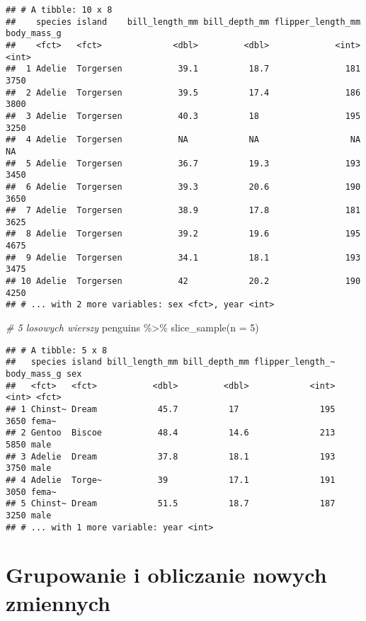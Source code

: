 \documentclass[
]{book}
\newenvironment{Shaded}{\begin{snugshade}}{\end{snugshade}}
\newcommand{\AttributeTok}[1]{\textcolor[rgb]{0.77,0.63,0.00}{#1}}
\newcommand{\CommentTok}[1]{\textcolor[rgb]{0.56,0.35,0.01}{\textit{#1}}}
\newcommand{\DecValTok}[1]{\textcolor[rgb]{0.00,0.00,0.81}{#1}}
\newcommand{\FunctionTok}[1]{\textcolor[rgb]{0.00,0.00,0.00}{#1}}
\newcommand{\NormalTok}[1]{#1}
\newcommand{\SpecialCharTok}[1]{\textcolor[rgb]{0.00,0.00,0.00}{#1}}
\begin{document}
\begin{verbatim}
## # A tibble: 10 x 8
##    species island    bill_length_mm bill_depth_mm flipper_length_mm body_mass_g
##    <fct>   <fct>              <dbl>         <dbl>             <int>       <int>
##  1 Adelie  Torgersen           39.1          18.7               181        3750
##  2 Adelie  Torgersen           39.5          17.4               186        3800
##  3 Adelie  Torgersen           40.3          18                 195        3250
##  4 Adelie  Torgersen           NA            NA                  NA          NA
##  5 Adelie  Torgersen           36.7          19.3               193        3450
##  6 Adelie  Torgersen           39.3          20.6               190        3650
##  7 Adelie  Torgersen           38.9          17.8               181        3625
##  8 Adelie  Torgersen           39.2          19.6               195        4675
##  9 Adelie  Torgersen           34.1          18.1               193        3475
## 10 Adelie  Torgersen           42            20.2               190        4250
## # ... with 2 more variables: sex <fct>, year <int>
\end{verbatim}

\begin{Shaded}
\begin{Highlighting}[]
\CommentTok{\# 5 losowych wierszy}
\NormalTok{penguins }\SpecialCharTok{\%\textgreater{}\%} \FunctionTok{slice\_sample}\NormalTok{(}\AttributeTok{n =} \DecValTok{5}\NormalTok{)}
\end{Highlighting}
\end{Shaded}

\begin{verbatim}
## # A tibble: 5 x 8
##   species island bill_length_mm bill_depth_mm flipper_length_~ body_mass_g sex  
##   <fct>   <fct>           <dbl>         <dbl>            <int>       <int> <fct>
## 1 Chinst~ Dream            45.7          17                195        3650 fema~
## 2 Gentoo  Biscoe           48.4          14.6              213        5850 male 
## 3 Adelie  Dream            37.8          18.1              193        3750 male 
## 4 Adelie  Torge~           39            17.1              191        3050 fema~
## 5 Chinst~ Dream            51.5          18.7              187        3250 male 
## # ... with 1 more variable: year <int>
\end{verbatim}

\hypertarget{grupowanie-i-obliczanie-nowych-zmiennych}{%
\section{Grupowanie i obliczanie nowych zmiennych}\label{grupowanie-i-obliczanie-nowych-zmiennych}}
\end{document}
